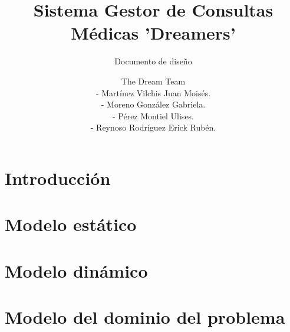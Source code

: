 \documentclass[oneside,10pt]{book}
\title{Sistema Gestor de Consultas Médicas 'Dreamers'}
\subtitle{Documento de diseño}
\author{The Dream Team \\
- Martínez Vilchis Juan Moisés. \\
- Moreno González Gabriela. \\
- Pérez Montiel Ulises. \\
- Reynoso Rodríguez Erick Rubén. \\
}
\begin{document}
\maketitle
\thispagestyle{empty}

\frontmatter
\tableofcontents

\mainmatter

\chapter{Introducción}


\chapter{Modelo estático}


\chapter{Modelo dinámico}


\chapter{Modelo del dominio del problema}

\end{document}
